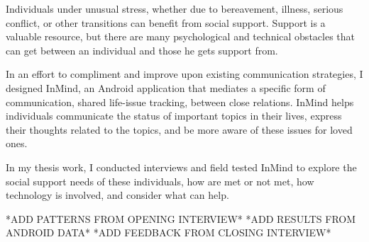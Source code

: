 %

Individuals under unusual stress, whether due to bereavement, illness,
serious conflict, or other transitions can benefit from social support.
Support is a valuable resource,
but there are many psychological and technical obstacles
that can get between an individual
and those he gets support from.

In an effort to compliment and improve upon existing communication strategies,
I designed InMind, an Android application
that mediates a specific form of communication,
shared life-issue tracking,
between close relations.
InMind helps individuals communicate
the status of important topics in their lives,
express their thoughts related to the topics,
and be more aware of these issues for loved ones.

In my thesis work, I conducted interviews and field tested InMind
to explore the social support needs of
these individuals, how are met or not met,
how technology is involved, and consider what can help.

*ADD PATTERNS FROM OPENING INTERVIEW*
*ADD RESULTS FROM ANDROID DATA*
*ADD FEEDBACK FROM CLOSING INTERVIEW*
